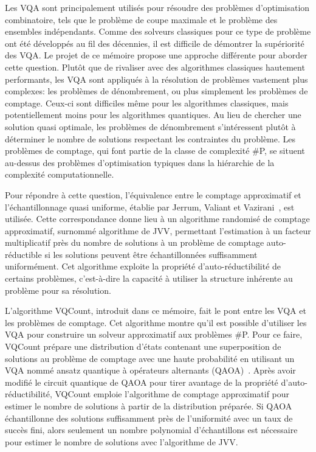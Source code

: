 Les VQA sont principalement utilisés pour résoudre des problèmes d'optimisation combinatoire, tels que le problème de coupe maximale et le problème des ensembles indépendants. Comme des solveurs classiques pour ce type de problème ont été développés au fil des décennies, il est difficile de démontrer la supériorité des VQA. Le projet de ce mémoire propose une approche différente pour aborder cette question. Plutôt que de rivaliser avec des algorithmes classiques hautement performants, les VQA sont appliqués à la résolution de problèmes vastement plus complexes: les problèmes de dénombrement, ou plus simplement les problèmes de comptage. Ceux-ci sont difficiles même pour les algorithmes classiques, mais potentiellement moins pour les algorithmes quantiques. Au lieu de chercher une solution quasi optimale, les problèmes de dénombrement s'intéressent plutôt à déterminer le nombre de solutions respectant les contraintes du problème. Les problèmes de comptage, qui font partie de la classe de complexité \textsf{\#P}, se situent au-dessus des problèmes d'optimisation typiques dans la hiérarchie de la complexité computationnelle.

Pour répondre à cette question, l'équivalence entre le comptage approximatif et l'échantillonnage quasi uniforme, établie par Jerrum, Valiant et Vazirani~\cite{jerrumRandomGenerationCombinatorial1986}, est utilisée. Cette correspondance donne lieu à un algorithme randomisé de comptage approximatif, surnommé algorithme de JVV, permettant l'estimation à un facteur multiplicatif près du nombre de solutions à un problème de comptage auto-réductible si les solutions peuvent être échantillonnées suffisamment uniformément. Cet algorithme exploite la propriété d'auto-réductibilité de certains problèmes, c'est-à-dire la capacité à utiliser la structure inhérente au problème pour sa résolution.

L'algorithme VQCount, introduit dans ce mémoire, fait le pont entre les VQA et les problèmes de comptage. Cet algorithme montre qu'il est possible d'utiliser les VQA pour construire un solveur approximatif aux problèmes \textsf{\#P}. Pour ce faire, VQCount prépare une distribution d'états contenant une superposition de solutions au problème de comptage avec une haute probabilité en utilisant un VQA nommé ansatz quantique à opérateurs alternants (QAOA)~\cite{hadfieldQuantumApproximateOptimization2019}. Après avoir modifié le circuit quantique de QAOA pour tirer avantage de la propriété d'auto-réductibilité, VQCount emploie l'algorithme de comptage approximatif pour estimer le nombre de solutions à partir de la distribution préparée. Si QAOA échantillonne des solutions suffisamment près de l'uniformité avec un taux de succès fini, alors seulement un nombre polynomial d'échantillons est nécessaire pour estimer le nombre de solutions avec l'algorithme de JVV. 

